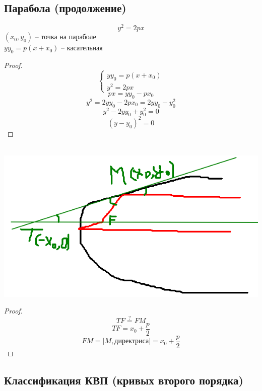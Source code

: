 \chapter{}

\section{Парабола (продолжение)}

\begin{theorem}
	$$ y^2 = 2px $$
    $ (x_0, y_0) $ -- точка на параболе \\
    $ yy_0 = p(x + x_0) $ -- касательная
\end{theorem}

\begin{proof}
    $$ \begin{cases} yy_0 = p(x + x_0) \\ y^2 = 2px \end{cases} $$
    $$ px = yy_0 - px_0 $$
    $$ y^2 = 2yy_0 - 2px_0 = 2yy_0 - y_0^2 $$
    $$ y^2 - 2yy_0 + y_0^2 = 0 $$
    $$ (y - y_0)^2 = 0 $$
\end{proof}

\begin{theorem}
    \hfill \\
	\includegraphics[scale=0.5]{1}
\end{theorem}

\begin{proof}
	$$ TF \stackrel?= FM $$
    $$ TF = x_0 + \frac{p}2 $$
    $$ FM = |M, \text{директриса} | = x_0 + \frac{p}2 $$
\end{proof}
\section{Классификация КВП (кривых второго порядка)}

